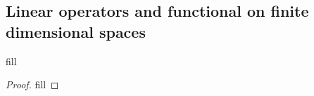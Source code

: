 \subsection{Linear operators and functional on finite dimensional spaces}

\begin{exercise}{1}
fill
\end{exercise}
\begin{proof}
fill
\end{proof}